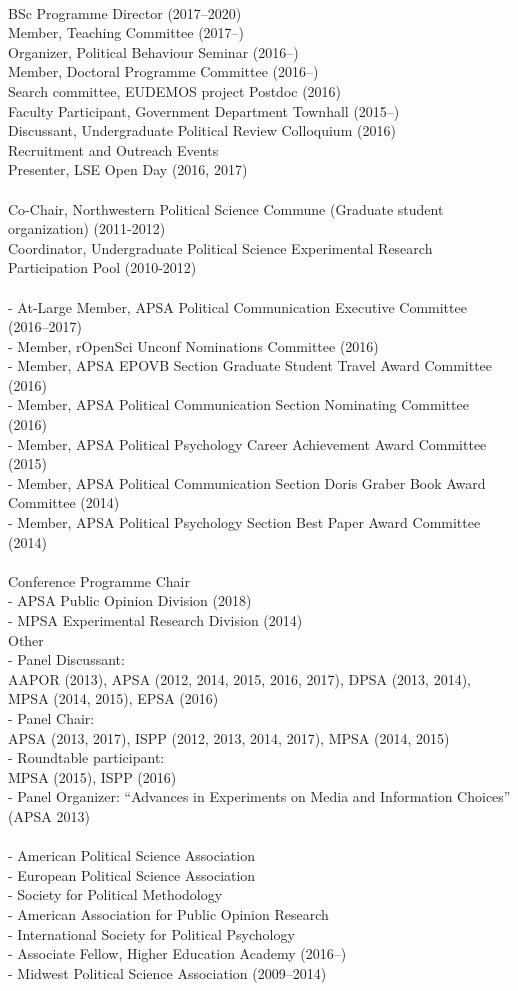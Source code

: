 \documentclass[12pt]{article}
\newcommand{\topic}[1]{\pagebreak[3]\indent {\color{lg}{\footnotesize #1 }}\\}
\newcommand{\entry}[1]{\indent {\color{lg}\guillemotright}\hspace{2pt}#1\vspace{.25em}\\}
\newcommand{\subentry}[1]{{\color{lg}-} #1\vspace{.25em}\\}
\begin{document}
\topic{Departmental (London School of Economics and Political Science)}
	\entry{BSc Programme Director (2017--2020)}
    \entry{Member, Teaching Committee (2017--)}
    \entry{Organizer, Political Behaviour Seminar (2016--)}
	\entry{Member, Doctoral Programme Committee (2016--)}
    \entry{Search committee, EUDEMOS project Postdoc (2016)}
	\entry{Faculty Participant, Government Department Townhall (2015--)}
	\entry{Discussant, Undergraduate Political Review Colloquium (2016)}
    \entry{Recruitment and Outreach Events}
        \entry{Presenter, LSE Open Day (2016, 2017)}

\topic{Departmental (Northwestern University)}
	\entry{Co-Chair, Northwestern Political Science Commune (Graduate student organization) (2011-2012)}
	\entry{Coordinator, Undergraduate Political Science Experimental Research Participation Pool (2010-2012)}

\topic{Disciplinary Committees}
		\subentry{At-Large Member, APSA Political Communication Executive Committee (2016--2017)}
		\subentry{Member, rOpenSci Unconf Nominations Committee (2016)}
		\subentry{Member, APSA EPOVB Section Graduate Student Travel Award Committee (2016)}
		\subentry{Member, APSA Political Communication Section Nominating Committee (2016)}
		\subentry{Member, APSA Political Psychology Career Achievement Award Committee (2015)}
		\subentry{Member, APSA Political Communication Section Doris Graber Book Award Committee (2014)}
		\subentry{Member, APSA Political Psychology Section Best Paper Award Committee (2014)}

\topic{Service at Professional Conferences}
    \entry{Conference Programme Chair}
        \subentry{APSA Public Opinion Division (2018)}
        \subentry{MPSA Experimental Research Division (2014)}
	\entry{Other}
        \subentry{Panel Discussant:\\ AAPOR (2013), APSA (2012, 2014, 2015, 2016, 2017), DPSA (2013, 2014), MPSA (2014, 2015), EPSA (2016)}
		\subentry{Panel Chair:\\ APSA (2013, 2017), ISPP (2012, 2013, 2014, 2017), MPSA (2014, 2015)}
		\subentry{Roundtable participant:\\ MPSA (2015), ISPP (2016)}
		\subentry{Panel Organizer: ``Advances in Experiments on Media and Information Choices'' (APSA 2013)}

\topic{Professional Memberships:}
		\subentry{American Political Science Association}
		\subentry{European Political Science Association}
        \subentry{Society for Political Methodology}
		\subentry{American Association for Public Opinion Research}
		\subentry{International Society for Political Psychology}
		\subentry{Associate Fellow, Higher Education Academy (2016--)}
        \subentry{Midwest Political Science Association (2009--2014)}
		
\end{document}
